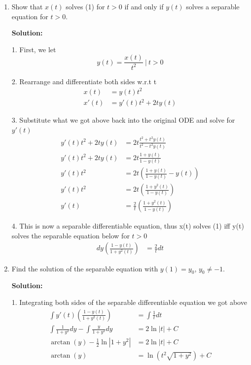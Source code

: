 \documentclass[12pt]{article}
\begin{document}
\begin{enumerate}
    \item[(a)] Show that $x(t)$ solves (1) for $t > 0$ if and only if $y(t)$ solves a separable equation for $t > 0$.

          \textbf{Solution:}

          1. First, we let
          \[
              y(t) = \frac{x(t)}{t^2} ~|~ t>0
          \]

          2. Rearrange and differentiate both sides w.r.t t
          \begin{align*}
              x(t)  & =   y(t)t^2         \\
              x'(t) & = y'(t)t^2 + 2ty(t)
          \end{align*}

          3. Substitute what we got above back into the original ODE and solve for $y'(t)$
          \begin{align*}
              y'(t)t^2 + 2ty(t) & = 2t \frac{t^2 + t^2y(t)}{t^2 -  t^2y(t)} \\
              y'(t)t^2 + 2ty(t) & = 2t \frac{1 + y(t)}{1 -  y(t)}           \\
              y'(t)t^2          & = 2t(\frac{1 + y(t)}{1 -  y(t)}-y(t))     \\
              y'(t)t^2          & = 2t(\frac{1+y^2(t)}{1-y(t)})             \\
              y'(t)             & = \frac{2}{t}(\frac{1+y^2(t)}{1-y(t)})
          \end{align*}

          4. This is now a separable differentiable equation, thus x(t) solves (1) iff y(t) solves the separable equation below for $t>0$
          \begin{align*}
              dy(\frac{1-y(t)}{1+y^2(t)}) & = \frac{2}{t}dt
          \end{align*}

    \item[(b)] Find the solution of the separable equation with $y(1) = y_0$, $y_0 \neq -1$.

          \textbf{Solution:}

          1. Integrating both sides of the separable differentiable equation we got above
          \begin{align*}
              \int{}y'(t)(\frac{1-y(t)}{1+y^2(t)})              & = \int{\frac{1}{t}dt}        \\
              \int{\frac{1}{1+y^2}}dy - \int{\frac{y}{1+y^2}}dy & =  2\ln{|t|} + C             \\
              \arctan{(y)} - \frac{1}{2}\ln{|1+y^2|}            & =  2\ln{|t|} + C             \\
              \arctan{(y)}                                      & = \ln{(t^2\sqrt{1+y^2})} + C
          \end{align*}



\end{enumerate}
\end{document}
